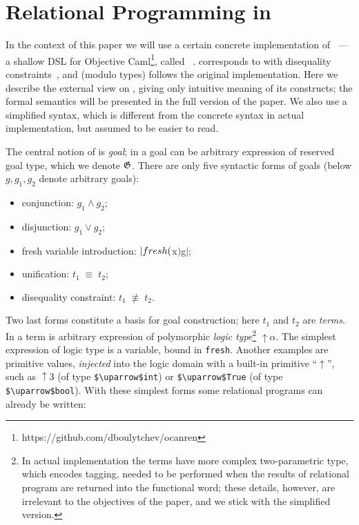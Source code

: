 \section{Relational Programming in \miniKanren}
\label{ocanren}

In the context of this paper we will use a certain concrete implementation of ~--- a shallow DSL for Objective 
Caml\footnote{https://github.com/dboulytchev/ocanren}, called \ocanren~\cite{ocanren}. \ocanren corresponds to \miniKanren with
disequality constraints~\cite{CKanren}, and (modulo types) follows the original implementation. Here we describe the external view 
on \ocanren, giving only intuitive meaning of its constructs; the formal semantics will be presented in the full version of the paper. %
We also use a simplified syntax, which is different from the concrete syntax in actual implementation, but assumed to
be easier to read.

The central notion of \miniKanren is \emph{goal}; in \ocanren a goal can be arbitrary expression of reserved goal type, which we denote $\mathfrak G$.
There are only five syntactic forms of goals (below $g, g_1, g_2$ denote arbitrary goals):

\begin{itemize}
  \item conjunction: $g_1\wedge g_2$;
  \item disjunction: $g_1\vee g_2$;
  \item fresh variable introduction: $\lstinline|fresh ($x$) $\;g$|$;
  \item unification: $t_1\;\equiv\;t_2$;
  \item disequality constraint: $t_1\;\not\equiv\;t_2$.
\end{itemize}

Two last forms constitute a basis for goal construction; here $t_1$ and $t_2$ are \emph{terms}. In \ocanren a term is
arbitrary expression of polymorphic \emph{logic type}\footnote{In actual 
implementation the terms have more complex two-parametric type, which encodes tagging, needed to be performed when the results of
relational program are returned into the functional word; these details, however, are irrelevant to the objectives of the paper, and we stick with the 
simplified version.} $\uparrow\!\alpha$. The simplest expression of logic type is a variable, bound in \lstinline|fresh|. Another examples are primitive values, \emph{injected} 
into the logic domain with a built-in primitive ``$\uparrow$'', such as $\uparrow\!3$ (of type \lstinline|$\uparrow$int|) or \lstinline|$\uparrow$True| 
(of type \lstinline|$\uparrow$bool|). With these simplest forms some relational programs can already be written:

